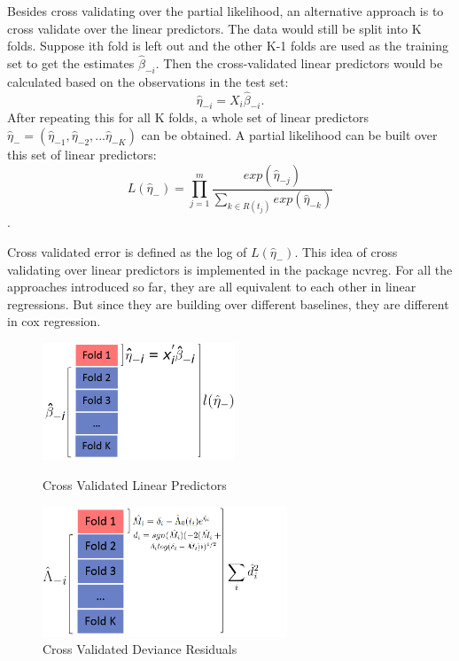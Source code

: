 \documentclass{article}\usepackage[]{graphicx}\usepackage[]{color}
\begin{document}
Besides cross validating over the partial likelihood, an alternative approach is to cross validate over the linear predictors. The data would still be split into K folds. Suppose ith fold is left out and the other K-1 folds are used as the training set to get the estimates $\hat{\beta}_{-i}$. Then the cross-validated linear predictors would be calculated based on the observations in the test set:  \begin{equation}\hat{\eta}_{-i} = X_{i}\hat{\beta}_{-i}.\end{equation} After repeating this for all K folds, a whole set of linear predictors  $\hat{\eta}_{-} = ( \hat{\eta}_{-1},  \hat{\eta}_{-2} , ...  \hat{\eta}_{-K})$ can be obtained. A partial likelihood can be built over this set of linear predictors: \begin{equation} L(\hat{\eta}_{-}) = \prod_{j=1}^{m} \frac{exp (\hat{\eta}_{-j})}{\sum_{ k \in R(t_{j})}exp (\hat{\eta}_{-k})}\end{equation}.

Cross validated error is defined as the log of $L(\hat{\eta}_{-})$. This idea of cross validating over linear predictors is implemented in the package ncvreg. For all the approaches introduced so far, they are all equivalent to each other in linear regressions. But since they are building over different baselines, they are different in cox regression.

   \begin{figure}[h]
    \centering
    \begin{minipage}[b]{0.5\textwidth}
      \centering
		  \includegraphics[height= 3.5cm ]{./figures/03.png}
      \caption{Cross Validated Linear Predictors}
     \end{minipage}
     \begin{minipage}[b]{0.5\textwidth}
      \centering
		  \includegraphics[height= 3.9cm ]{./figures/04.png}
      \caption{Cross Validated Deviance Residuals}
      \end{minipage}	
   \end{figure}	
    
\end{document}

